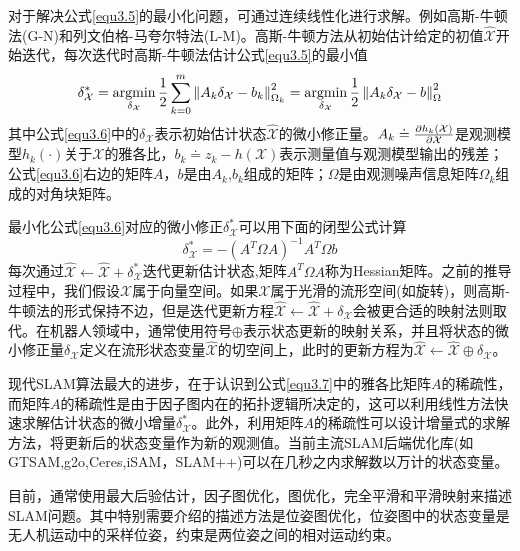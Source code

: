 对于解决公式\eqref{equ3.5}的最小化问题，可通过连续线性化进行求解。例如高斯-牛顿法(G-N)和列文伯格-马夸尔特法(L-M)。高斯-牛顿方法从初始估计给定的初值$\hat{\mathcal{X}}$开始迭代，每次迭代时高斯-牛顿法估计公式\eqref{equ3.5}的最小值
\begin{equation}
\label{equ3.6}
\delta_\mathcal{X}^* 
=
\operatorname*{argmin} \limits_{\delta_\mathcal{X}} {1 \over 2} \sum \limits_{k=0}^{m} \left\| A_k\delta_\mathcal{X}-b_k \right\|_{\Omega_k}^2
=
\operatorname*{argmin} \limits_{\delta_\mathcal{X}} {1 \over 2} \left\| A_k\delta_\mathcal{X}-b \right\|_{\Omega}^2
\end{equation}
其中公式\eqref{equ3.6}中的$\delta_\mathcal{X}$表示初始估计状态$\hat{\mathcal{X}}$的微小修正量。$A_k \doteq {\partial h_k(\mathcal{X}) \over \partial \mathcal{X}} $是观测模型$h_k(\cdot)$关于$\mathcal{X}$的雅各比，$b_k \doteq z_k-h(\mathcal{X})$表示测量值与观测模型输出的残差；公式\eqref{equ3.6}右边的矩阵$A$，$b$是由$A_k$,$b_k$组成的矩阵；$\Omega$是由观测噪声信息矩阵$\Omega_k$组成的对角块矩阵。

最小化公式\eqref{equ3.6}对应的微小修正$\delta_\mathcal{X}^* $可以用下面的闭型公式计算
\begin{equation}
\label{equ3.7}
\delta_\mathcal{X}^* = - \left( A^T \Omega A \right)^{-1} A^T \Omega b
\end{equation}
每次通过$\hat{\mathcal{X}} \leftarrow \hat{\mathcal{X}}+\delta_\mathcal{X}^*$迭代更新估计状态,矩阵$A^T \Omega A$称为Hessian矩阵。之前的推导过程中，我们假设$\mathcal{X}$属于向量空间。如果$\mathcal{X}$属于光滑的流形空间(如旋转)，则高斯-牛顿法的形式保持不边，但是迭代更新方程$\hat{\mathcal{X}} \leftarrow \hat{\mathcal{X}}+\delta_\mathcal{X}$会被更合适的映射法则取代。在机器人领域中，通常使用符号$\oplus$表示状态更新的映射关系，并且将状态的微小修正量$\delta_\mathcal{X}$定义在流形状态变量$\hat{\mathcal{X}}$的切空间上，此时的更新方程为$\hat{\mathcal{X}}  \leftarrow \hat{\mathcal{X}} \oplus \delta_\mathcal{X}$。

现代SLAM算法最大的进步，在于认识到公式\eqref{equ3.7}中的雅各比矩阵$A$的稀疏性，而矩阵$A$的稀疏性是由于因子图内在的拓扑逻辑所决定的，这可以利用线性方法快速求解估计状态的微小增量$\delta_\mathcal{X}^*$。此外，利用矩阵$A$的稀疏性可以设计增量式的求解方法，将更新后的状态变量作为新的观测值。当前主流SLAM后端优化库(如GTSAM,g2o,Ceres,iSAM，SLAM++)可以在几秒之内求解数以万计的状态变量。

目前，通常使用最大后验估计，因子图优化，图优化，完全平滑和平滑映射来描述SLAM问题。其中特别需要介绍的描述方法是位姿图优化，位姿图中的状态变量是无人机运动中的采样位姿，约束是两位姿之间的相对运动约束。

